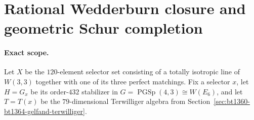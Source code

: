\section{Rational Wedderburn closure and geometric Schur completion}
\label{sec:bt1365-bt1369-rational-schur}

\paragraph{Exact scope.}
Let $X$ be the $120$-element selector set consisting of a totally isotropic
line of $W(3,3)$ together with one of its three perfect matchings.  Fix a
selector $x$, let $H=G_x$ be its order-$432$ stabilizer in
$G=\operatorname{PGSp}(4,3)\cong W(E_6)$, and let $T=T(x)$ be the
$79$-dimensional Terwilliger algebra from Section~\ref{sec:bt1360-bt1364-gelfand-terwilliger}.

